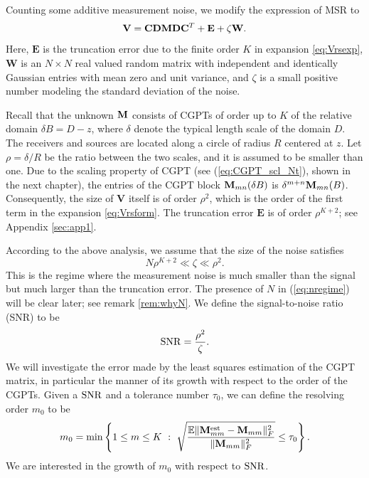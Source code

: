 Counting some additive measurement noise, we modify the expression
of MSR to
\begin{equation}
\mathbf{V} = \mathbf{C} \mathbf{D} \mathbf{M} \mathbf{D} \mathbf{C}^T + \mathbf{E} +
\zeta \mathbf{W}. \label{eq:Vmodel}
\end{equation}
Here, $\mathbf{E}$ is the truncation error due to the finite order
$K$ in expansion \eqref{eq:Vrsexp}, $\mathbf{W}$ is an $N \times
N$ real valued random matrix with independent and identically
Gaussian entries with mean zero and unit variance, and
$\zeta$ is a small positive number modeling the
standard deviation of the noise.

Recall that the unknown $\mathbf{M}$ consists of CGPTs of order up to
$K$ of the relative domain $\delta B = D - z$, where $\delta$
denote the typical length scale of the domain $D$. The receivers
and sources are located along a circle of radius $R$ centered at
$z$. Let $\rho = \delta/R$ be the ratio between the two scales,
and it is assumed to be smaller than one. Due to the scaling
property of CGPT (see (\ref{eq:CGPT_scl_Nt}), shown in the next chapter), the entries of the
CGPT block $\mathbf{M}_{mn}(\delta B)$ is
$\delta^{m+n}\mathbf{M}_{mn}(B)$. Consequently, the size of
$\mathbf{V}$ itself is of order $\rho^2$, which is the order of
the first term in the expansion \eqref{eq:Vrsform}. The truncation
error $\mathbf{E}$ is of order $\rho^{K+2}$; see Appendix
\ref{sec:app1}.

According to the above analysis, we assume that the size of the
noise satisfies
\begin{equation}
N \rho^{K+2} \ll \zeta \ll \rho^2.
\label{eq:nregime}
\end{equation}
This is the regime where the measurement noise is much smaller
than the signal but much larger than the truncation error. The
presence of $N$ in (\ref{eq:nregime}) will be clear later; see
remark \ref{rem:whyN}. We define the signal-to-noise ratio (SNR)
to be
$$
\mathrm{SNR} = \frac{\rho^2}{\zeta}.
$$
We will investigate the error made by the least squares estimation
of the CGPT matrix, in particular the manner of its growth with
respect to the order of the CGPTs. Given a $\mathrm{SNR}$ and a tolerance
number $\tau_0$, we can define the resolving order $m_0$ to be
\begin{equation}
m_0 = \min \left\{ 1 \le m \le K ~:~ \sqrt{\frac{\mathbb{E}
\|\mathbf{M}^{\mathrm{est}}_{mm} -
\mathbf{M}_{mm}\|^2_F}{\|\mathbf{M}_{mm}\|^2_F}} \le \tau_0 \right\}.
\label{eq:msdef}
\end{equation}
We are interested in the growth of $m_0$ with respect to $\mathrm{SNR}$.

